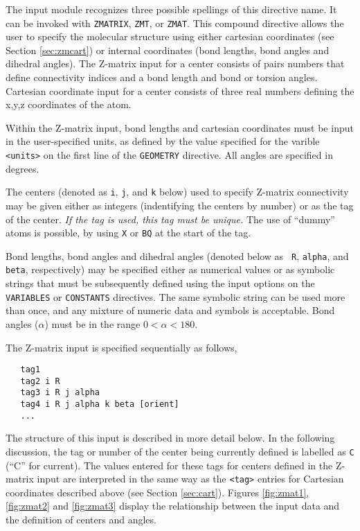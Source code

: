 The input module recognizes three possible spellings of this directive name.
It can be invoked with \verb+ZMATRIX+, \verb+ZMT+, or \verb+ZMAT+.
This compound directive allows the user to specify
the molecular structure using
either cartesian coordinates (see Section \ref{sec:zmcart}) or internal
coordinates (bond lengths, bond angles and dihedral angles).  The
Z-matrix input for a center consists of pairs numbers that define
connectivity indices and a bond length and bond or torsion angles.
Cartesian coordinate input for a center consists of three real numbers defining the
x,y,z coordinates of the atom.  

Within the Z-matrix input, bond lengths and cartesian coordinates must
be input in the user-specified units, as defined by the value specified
for the varible \verb+<units>+ on the first line of the \verb+GEOMETRY+
directive.  All angles are specified in
degrees.


The centers (denoted as \verb+i+, \verb+j+, and \verb+k+ below) used
to specify Z-matrix connectivity may be given either as integers
(indentifying the centers by number) or as the tag of the center.
{\em If the tag is used, this tag must be unique.} The use of
``dummy'' atoms is possible, by using \verb+X+ or \verb+BQ+ at the
start of the tag.

Bond lengths, bond angles and dihedral angles (denoted below as {\tt
  R}, {\tt alpha}, and {\tt beta}, respectively) may be specified either as
numerical values or as symbolic strings that must be subsequently
defined using the input options on the \verb+VARIABLES+ or 
\verb+CONSTANTS+ directives.  The same symbolic string can be used
more than once, and any
mixture of numeric data and symbols is acceptable. Bond angles
($\alpha$) must be in the range $0 < \alpha < 180$.

The Z-matrix input is specified sequentially as follows,
\begin{verbatim}
   tag1
   tag2 i R
   tag3 i R j alpha
   tag4 i R j alpha k beta [orient]
   ...
\end{verbatim}

The structure of this input is described in more detail below.  
In the following discussion, the tag or number
of the center being currently defined is labelled as \verb+C+ (``C''
for current).  The values entered for these tags for centers 
defined in the Z-matrix input are interpreted
in the same way as the \verb+<tag>+ entries for Cartesian
coordinates described above (see Section \ref{sec:cart}).
Figures \ref{fig:zmat1}, \ref{fig:zmat2} and \ref{fig:zmat3}
display the relationship between the input data and the definition of
centers and angles.


